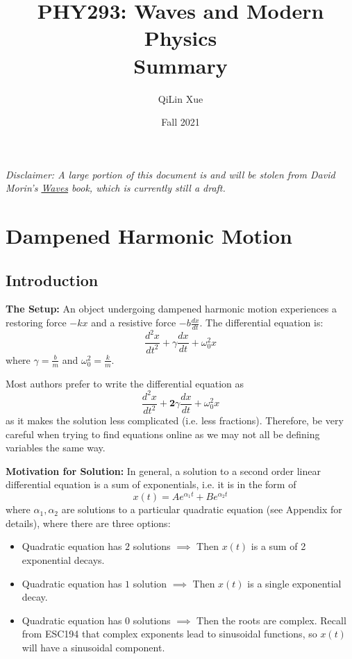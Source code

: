\documentclass{article}
\title{PHY293: Waves and Modern Physics \\ \textbf{Summary}}
\author{QiLin Xue}
\date{Fall 2021}
\begin{document}
\maketitle
\textit{Disclaimer: A large portion of this document is and will be stolen from David Morin's \href{https://scholar.harvard.edu/david-morin/waves}{Waves} book, which is currently still a draft.}
\section{Dampened Harmonic Motion}
\subsection{Introduction}
\textbf{The Setup:} An object undergoing dampened harmonic motion experiences a restoring force $-kx$ and a resistive force $-b \frac{dx}{dt}$. The differential equation is: 
\begin{equation}
    \frac{d^2x}{dt^2} + \gamma \frac{dx}{dt} + \omega_0^2 x
\end{equation}
where $\gamma = \frac{b}{m}$ and $\omega_0^2 = \frac{k}{m}.$
\begin{warning}
    Most authors prefer to write the differential equation as 
    \begin{equation*}
        \frac{d^2x}{dt^2} + \mathbf{2}\gamma \frac{dx}{dt} + \omega_0^2 x
    \end{equation*}
    as it makes the solution less complicated (i.e. less fractions). Therefore, be very careful when trying to find equations online as we may not all be defining variables the same way.
\end{warning}
\textbf{Motivation for Solution:} In general, a solution to a second order linear differential equation is a sum of exponentials, i.e. it is in the form of 
\begin{equation*}
    x(t) = Ae^{\alpha_1 t} + Be^{\alpha_2 t}
\end{equation*}
where $\alpha_1,\alpha_2$ are solutions to a particular quadratic equation (see Appendix for details), where there are three options: 
\begin{itemize}
    \item Quadratic equation has $2$ solutions $\implies$ Then $x(t)$ is a sum of 2 exponential decays.
    \item Quadratic equation has $1$ solution $\implies$ Then $x(t)$ is a single exponential decay.
    \item Quadratic equation has $0$ solutions $\implies$ Then the roots are complex. Recall from ESC194 that complex exponents lead to sinusoidal functions, so $x(t)$ will have a sinusoidal component. 
\end{itemize}
\end{document}
